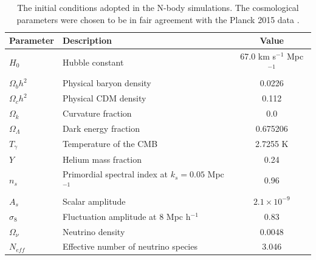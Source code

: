 \documentclass{aastex}
\begin{document}
\begin{table}[h]
\caption{The initial conditions adopted in
  the N-body simulations.  The cosmological parameters were chosen to
  be in fair agreement with the Planck 2015 data \citep{planck15}.}\label{tbl:initialconditions}
\begin{center}
\begin{tabular}{llc}
\toprule
Parameter & Description & Value \\\hline\hline
$H_0$ & Hubble constant & 67.0 km s$^{-1}$ Mpc$^{-1}$ \\
$\Omega_b h^2$ & Physical baryon density & 0.0226 \\
$\Omega_c h^2$ & Physical CDM density & 0.112 \\
$\Omega_k$ & Curvature fraction & 0.0 \\
$\Omega_\Lambda$ & Dark energy fraction & 0.675206 \\
$T_{\gamma}$ & Temperature of the CMB  & 2.7255 K \\ 
$Y$ & Helium mass fraction & 0.24 \\
$n_s$ & Primordial spectral index at $k_s = 0.05$ Mpc$^{-1}$ & 0.96 \\
$A_s$ & Scalar amplitude & $2.1 \times 10^{-9}$ \\
$\sigma_8$  &Fluctuation amplitude at 8 Mpc h$^{−1}$ & 0.83 \\%
$\Omega_\nu$ & Neutrino density & 0.0048 \footnotemark \\
$N_{eff}$ & Effective number of neutrino species &
                                                        3.046 \\ \bottomrule
\end{tabular}
\end{center}
\end{table}
\end{document}
